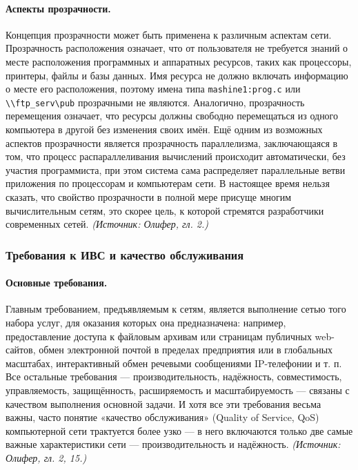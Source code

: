 \documentclass[a4paper,12pt]{article}
\begin{document}
\paragraph{Аспекты прозрачности.}
Концепция прозрачности может быть применена к различным аспектам сети. Прозрачность расположения означает, что от пользователя не требуется знаний о месте расположения программных и аппаратных ресурсов, таких как процессоры, принтеры, файлы и базы данных. Имя ресурса не должно включать информацию о месте его расположения, поэтому имена типа \texttt{mashine1:prog.c} или \texttt{\textbackslash\textbackslash ftp\_serv\textbackslash pub} прозрачными не являются. Аналогично, прозрачность перемещения означает, что ресурсы должны свободно перемещаться из одного компьютера в другой без изменения своих имён. Ещё одним из возможных аспектов прозрачности является прозрачность параллелизма, заключающаяся в том, что процесс распараллеливания вычислений происходит автоматически, без участия программиста, при этом система сама распределяет параллельные ветви приложения по процессорам и компьютерам сети. В настоящее время нельзя сказать, что свойство прозрачности в полной мере присуще многим вычислительным сетям, это скорее цель, к которой стремятся разработчики современных сетей.
\textit{(Источник: Олифер, гл. 2.)}

\subsubsection{Требования к ИВС и качество обслуживания}

\paragraph{Основные требования.}
Главным требованием, предъявляемым к сетям, является выполнение сетью того набора услуг, для оказания которых она предназначена: например, предоставление доступа к файловым архивам или страницам публичных web-сайтов, обмен электронной почтой в пределах предприятия или в глобальных масштабах, интерактивный обмен речевыми сообщениями IP-телефонии и т. п. Все остальные требования — производительность, надёжность, совместимость, управляемость, защищённость, расширяемость и масштабируемость — связаны с качеством выполнения основной задачи. И хотя все эти требования весьма важны, часто понятие «качество обслуживания» (Quality of Service, QoS) компьютерной сети трактуется более узко — в него включаются только две самые важные характеристики сети — производительность и надёжность.
\textit{(Источник: Олифер, гл. 2, 15.)}
\end{document}
